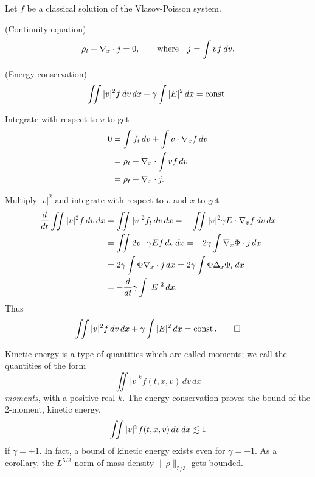 \documentclass[11pt]{amsart}
\begin{document}
\begin{lem}
Let $f$ be a classical solution of the Vlasov-Poisson system.
\begin{cond}
\item(Continuity equation)
\[\rho_t+\nabla_x\cdot j=0,\qquad\text{where}\quad j=\int vf\,dv.\]
\item(Energy conservation)
\[\iint|v|^2f\,dv\,dx+\gamma\int|E|^2\,dx=\operatorname{const}.\]
\end{cond}
\end{lem}
\begin{pfs}
\item
Integrate with respect to $v$ to get
\begin{align*}
0&=\int f_t\,dv+\int v\cdot\nabla_xf\,dv\\
&=\rho_t+\nabla_x\cdot\int vf\,dv\\
&=\rho_t+\nabla_x\cdot j.
\end{align*}
\item
Multiply $|v|^2$ and integrate with respect to $v$ and $x$ to get
\begin{align*}
\dd{t}\iint|v|^2f\,dv\,dx
&=\iint|v|^2f_t\,dv\,dx=-\iint|v|^2\gamma E\cdot\del_vf\,dv\,dx\\
&=\iint2v\cdot\gamma Ef\,dv\,dx=-2\gamma\int\del_x\Phi\cdot j\,dx\\
&=2\gamma\int\Phi\del_x\cdot j\,dx=2\gamma\int\Phi\Delta_x\Phi_t\,dx\\
&=-\dd{t}\gamma\int|E|^2\,dx.
\end{align*}
Thus
\[\iint|v|^2f\,dv\,dx+\gamma\int|E|^2\,dx=\operatorname{const}.\qedhere\]
\end{pfs}

Kinetic energy is a type of quantities which are called moments;
we call the quantities of the form
\[\iint|v|^kf(t,x,v)\,dv\,dx\]
\emph{moments}, with a positive real $k$.
The energy conservation proves the bound of the 2-moment, kinetic energy,
\[\iint|v|^2f(t,x,v)\,dv\,dx\lesssim1\]
if $\gamma=+1$.
In fact, a bound of kinetic energy exists even for $\gamma=-1$.
As a corollary, the $L^{5/3}$ norm of mass density $\|\rho\|_{5/3}$ gets bounded.
\end{document}
